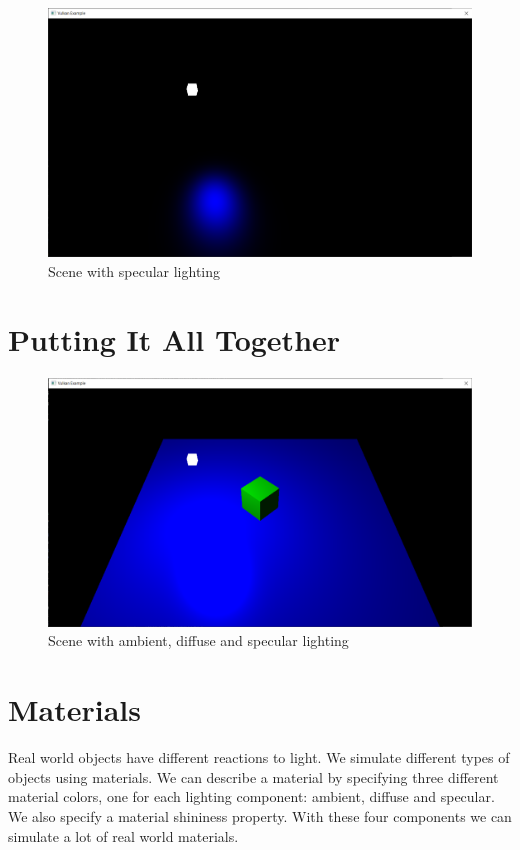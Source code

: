 \begin{figure}[ht]
    \centering
    \includegraphics[scale=0.25]{images/ChBlinnPhong/SceneSpecular.png}
    \caption{Scene with specular lighting}
    \label{fig::SceneSpecular}
\end{figure}

\section{Putting It All Together}

\begin{figure}[ht]
    \centering
    \includegraphics[scale=0.25]{images/ChBlinnPhong/SceneLit.png}
    \caption{Scene with ambient, diffuse and specular lighting}
    \label{fig::SceneLit}
\end{figure}

\section{Materials}

Real world objects have different reactions to light.
We simulate different types of objects using materials.
We can describe a material by specifying three different material colors,
one for each lighting component: ambient, diffuse and specular.
We also specify a material shininess property.
With these four components we can simulate a lot of real world materials.

